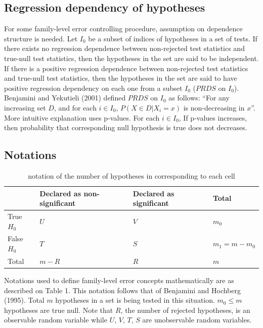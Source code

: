 \documentclass[a4paper, 11pt, oneside]{article}
\begin{document}
\subsection{Regression dependency of hypotheses}
For some family-level error controlling procedure, assumption on dependence structure is needed. Let $I_0$ be a subset of indices of hypotheses in a set of tests. If there exists no regression dependence between non-rejected test statistics and true-null test statistics, then the hypotheses in the set are said to be independent. If there is a positive regression dependence between non-rejected test statistics and true-null test statistics, then the hypotheses in the set are said to have positive regression dependency on each one from a subset $I_0$ ($PRDS$ on $I_0$). Benjamini and Yekutieli (2001) defined $PRDS$ on $I_0$ as follows: \enquote{For any increasing set $D$, and for each $i \in I_0$, $P(X \in D | X_i = x)$ is non-decreasing in $x$}. More intuitive explanation uses p-values. For each $i \in I_0$, If p-values increases, then probability that corresponding null hypothesis is true does not decreases.

\subsection{Notations}
\begin{table}[ht]
    \small
    \setlength{\tabcolsep}{3pt}
\centering
\begin{tabularx}{.7\hsize}{@{}l LLL@{}}
    \toprule
 & Declared as non-significant  & Declared as significant & Total \\
    \midrule
True $H_0$ 
    & $U$ 
        & $V$ 
            & $m_0$ \\
False $H_0$ 
    & $T$ 
        & $S$
            &  $m_1=m-m_0$ \\
Total & $m-R$ 
        & $R$ 
            & $m$ \\
    \bottomrule
\end{tabularx}
\caption{notation of the number of hypotheses in corresponding to each cell}
    \end{table}

Notations used to define family-level error concepts mathematically are as described on Table 1. This notation follows that of Benjamini and Hochberg (1995). Total $m$ hypotheses in a set is being tested in this situation. $m_0 \leq m$ hypotheses are true null. Note that $R$, the number of rejected hypotheses, is an observable random variable while $U$, $V$, $T$, $S$ are unobservable random variables.
\vspace{0.2in}
\end{document}
